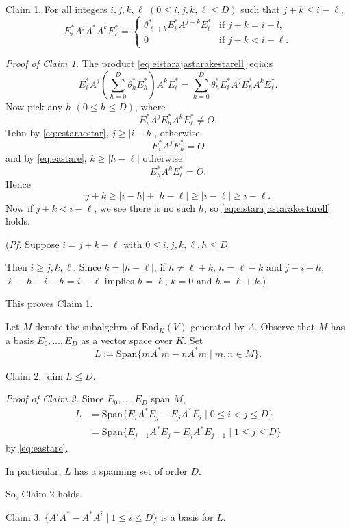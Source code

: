 \documentclass[
]{book}
\theoremstyle{definition}
\theoremstyle{definition}
\theoremstyle{definition}
\theoremstyle{definition}
\theoremstyle{remark}
\begin{document}
Claim 1. For all integers \(i,j,k,\ell\) \((0\leq i, j, k, \ell\leq D)\) such that \(j+k \leq i-\ell\),
\begin{equation}
E^*_iA^jA^*A^kE^*_\ell = \begin{cases} \theta^*_{\ell+k}E^*_iA^{j+k}E^*_\ell & \text{if } j+k = i-l,\\
0 & \text{if } j+k < i-\ell.\end{cases} \label{eq:eistarajastarakestarell}
\end{equation}

\emph{Proof of Claim 1.}
The product \eqref{eq:eistarajastarakestarell} eqia;s
\[E^*_iA^j\left(\sum_{h=0}^D \theta_h^* E_h^*\right)A^kE^*_\ell = \sum_{h=0}^D \theta^*_h E^*_iA^jE^*_hA^kE^*_\ell.\]
Now pick any \(h\) \((0\leq h\leq D)\), where
\[E^*_iA^jE^*_hA^kE^*_\ell \neq O.\]
Tehn by \eqref{eq:estaraestar}, \(j\geq |i-h|\), otherwise
\[E^*_iA^jE^*_h = O\]
and by \eqref{eq:eastare}, \(k\geq |h-\ell|\) otherwise
\[E^*_hA^kE^*_\ell = O.\]
Hence
\[j+k \geq |i-h|+|h-\ell| \geq |i-\ell| \geq i-\ell.\]
Now if \(j+k < i-\ell\), we see there is no such \(h\), so \eqref{eq:eistarajastarakestarell} holds.

(\emph{Pf.} Suppose \(i=j+k+\ell\) with \(0\leq i, j, k,\ell, h\leq D\).

Then \(i \geq j, k, \ell\). Since \(k = |h-\ell|\), if \(h\neq \ell+k\), \(h = \ell-k\) and \(j - i-h\),
\(\ell-h+i-h = i-\ell\) implies \(h=\ell\), \(k = 0\) and \(h = \ell + k\).)

This proves Claim 1.

Let \(M\) denote the subalgebra of \(\mathrm{End}_K(V)\) generated by \(A\). Observe that \(M\) has a basis \(E_0, \ldots, E_D\) as a vector space over \(K\). Set
\[L:= \mathrm{Span}\{mA^*m-nA^*m \mid m, n\in M\}.\]

Claim 2. \(\dim L \leq D\).

\emph{Proof of Claim 2.}
Since \(E_0, \ldots, E_D\) span \(M\),
\begin{align}
L & = \mathrm{Span}\{E_iA^*E_j - E_jA^*E_i \mid 0\leq i < j \leq D\}\\
& = \mathrm{Span}\{E_{j-1}A^*E_j - E_jA^*E_{j-1} \mid 1\leq j \leq D\}
\end{align}
by \eqref{eq:eastare}.

In particular, \(L\) has a spanning set of order \(D\).

So, Claim 2 holds.

Claim 3. \(\{A^iA^* - A^*A^i\mid 1\leq i\leq D\}\) is a basis for \(L\).
\end{document}
